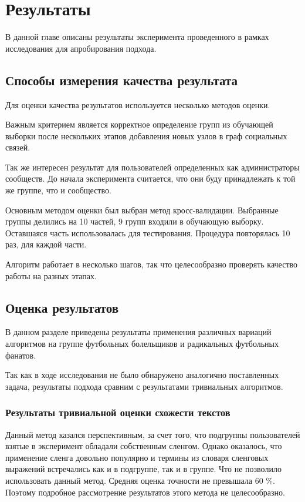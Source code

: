 \documentclass[annotation,times,page4]{itmo-student-thesis}
\begin{document}
\chapter{Результаты}
В данной главе описаны результаты эксперимента проведенного в рамках исследования для апробирования подхода.
\section{Способы измерения качества результата}
Для оценки качества результатов используется несколько методов оценки.

Важным критерием является корректное определение групп из обучающей выборки после нескольких этапов добавления новых узлов в граф социальных связей. 

Так же интересен результат для пользователей определенных как администраторы сообществ. До начала эксперимента считается, что они буду принадлежать к той же группе, что и сообщество.

Основным методом оценки был выбран метод кросс-валидации. Выбранные группы делились на 10 частей, 9 групп входили в обучающую выборку. Оставшаяся часть использовалась для тестирования. Процедура повторялась 10 раз, для каждой части.

Алгоритм работает в несколько шагов, так что целесообразно проверять качество работы на разных этапах.
\section{Оценка результатов}
В данном разделе приведены результаты применения различных вариаций алгоритмов на группе футбольных болельщиков и радикальных футбольных фанатов.

Так как в ходе исследования не было обнаружено аналогично поставленных задача, результаты подхода сравним с результатами тривиальных алгоритмов.
\subsection{Результаты тривиальной оценки схожести текстов}
Данный метод казался перспективным, за счет того, что подгруппы пользователей взятые в эксперимент обладали собственным сленгом. Однако оказалось, что 
применение сленга довольно популярно и термины из словаря сленговых выражений встречались как и в подгруппе, так и в группе. Что не позволило использовать данный метод. Средняя оценка точности не превышала 60 \%. Поэтому подробное рассмотрение результатов этого метода не целесообразно.
\end{document}
